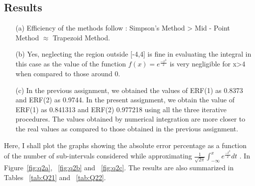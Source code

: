 \documentclass[titlepage, 11pt]{article}
\begin{document}
\subsection{Results}
\begin{itemize}
    \item [(a)] Efficiency of the methods follow : Simpson's Method > Mid - Point Method $\approx$ Trapezoid Method.
    \item [(b)] Yes, neglecting the region outside [-4,4] is fine in evaluating the integral in this case as the value of the function $f(x)= e^{\frac{-x^2}{2}}$ is very negligible for x>4 when compared to those around 0.
    \item [(c)] In the previous assignment, we obtained the values of ERF(1) as 0.8373 and ERF(2) as 0.9744. In the present assignment, we obtain the value of ERF(1) as 0.841313 and ERF(2) 0.977218 using all the three iterative procedures. The values obtained by numerical integration are more closer to the real values as compared to those obtained in the previous assignment. 
\end{itemize} 

Here, I shall plot the graphs showing the absolute error percentage as a function of the number of sub-intervals considered while approximating $\frac{1}{\sqrt{2\pi}} \int_{-\infty}^{x} e^{\frac{-t^2}{2}} dt$ . In Figure~\ref{fig:q2a}, ~\ref{fig:q2b} and ~\ref{fig:q2c}. The results are also summarized in Tables ~\ref{tab:Q21} and ~\ref{tab:Q22}.
\end{document}
